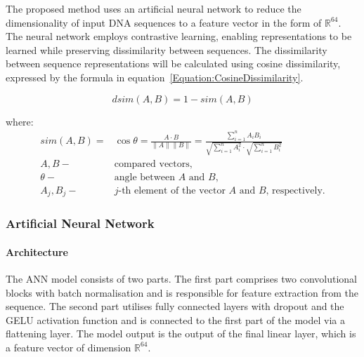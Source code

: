 \documentclass[biomedinformatics,article,submit,moreauthors]{Definitions/mdpi}
\begin{document}
    The proposed method  uses an artificial neural network to reduce the dimensionality of input DNA sequences to a feature vector in the form of $\mathbb{R}^{64}$.
    The neural network employs contrastive learning, enabling representations to be learned while preserving dissimilarity between sequences.
    The dissimilarity between sequence representations will be calculated using cosine dissimilarity, expressed by the formula in equation~\eqref{Equation:CosineDissimilarity}.

            \begin{equation}
                dsim(A, B) = 1 - sim(A, B)
                \label{Equation:CosineDissimilarity}
            \end{equation}

            where:
            \begin{align*}
                sim(A, B) =& \cos{\theta} = \frac{A \cdot B}{\|A\| \|B\|} = \frac{
                    \sum^{n}_{i = 1}A_i B_i
                }{
                    \sqrt{
                        \sum^{n}_{i = 1}A_i^2
                    }
                    \cdot
                    \sqrt{
                        \sum^{n}_{i = 1}B_i^2
                    }
                } \\
                A, B -& \text{compared vectors,} \\
                \theta -& \text{angle between $A$ and $B$,} \\
                A_j, B_j -& \text{$j$-th element of the vector $A$ and $B$, respectively.}
            \end{align*}

            \subsubsection{Artificial Neural Network}
                \paragraph{Architecture}
                The ANN model consists of two parts. The first part comprises two convolutional blocks with batch normalisation and is responsible for feature extraction from the sequence. The second part utilises fully connected layers with dropout and the GELU activation function and is connected to the first part of the model via a flattening layer.
                The model output is the output of the final linear layer, which is a feature vector of dimension \( \mathbb{R}^{64} \).
\end{document}
